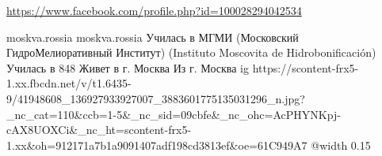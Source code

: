  
 
 
 
 

\url{https://www.facebook.com/profile.php?id=100028294042534}\par
moskva.rossia
moskva.rossia
Училась в МГМИ (Московский ГидроМелиоративный Институт) (Instituto Moscovita de Hidrobonificación)
Училась в 848
Живет в г. Москва
Из г. Москва
\ifcmt
  ig https://scontent-frx5-1.xx.fbcdn.net/v/t1.6435-9/41948608_136927933927007_3883601775135031296_n.jpg?_nc_cat=110&ccb=1-5&_nc_sid=09cbfe&_nc_ohc=AcPHYNKpj-cAX8UOXCi&_nc_ht=scontent-frx5-1.xx&oh=912171a7b1a9091407adf198cd3813ef&oe=61C949A7
  @width 0.15
\fi
